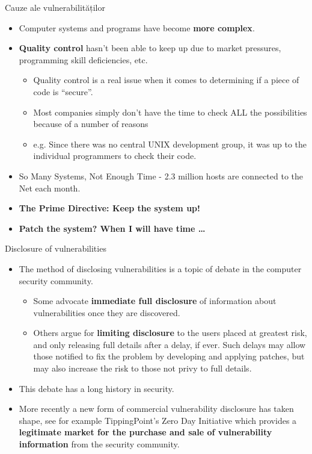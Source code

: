 \documentclass[pdf]{beamer}
\begin{document}
\begin{frame}{Cauze ale vulnerabilităților}
\begin{itemize}
\item
Computer systems and programs have become \textbf{more complex}.

\item
\textbf{Quality control} hasn’t been able to keep up due to market pressures, programming skill deficiencies, etc. 
\begin{itemize}
\item
Quality control is a real issue when it comes to determining if a piece of code is “secure”. 
\item
Most companies simply don’t have the time to check ALL the possibilities because of a number of reasons
\item
e.g. Since there was no central UNIX development group, it was up to the individual programmers to check their code. 
\end{itemize}

\item
So Many Systems, Not Enough Time - 2.3 million hosts are connected to the Net each month.  

\item
\textbf{The Prime Directive: Keep the system up!}
\item
\textbf{Patch the system? When I will have time …}

\end{itemize}
\end{frame}



\begin{frame}{Disclosure of vulnerabilities}
\begin{itemize}
\item
The method of disclosing vulnerabilities is a topic of debate in the computer security community. 
\begin{itemize}
\item
Some advocate \textbf{immediate full disclosure} of information about vulnerabilities once they are discovered. 

\item
Others argue for \textbf{limiting disclosure} to the users placed at greatest risk, and only releasing full details after a delay, if ever. Such delays may allow those notified to fix the problem by developing and applying patches, but may also increase the risk to those not privy to full details. 
\end{itemize}

\item
This debate has a long history in security. 

\item
More recently a new form of commercial vulnerability disclosure has taken shape, see for example TippingPoint's Zero Day Initiative which provides a \textbf{legitimate market for the purchase and sale of vulnerability information }from the security community.

\end{itemize}
\end{frame}
\end{document}
